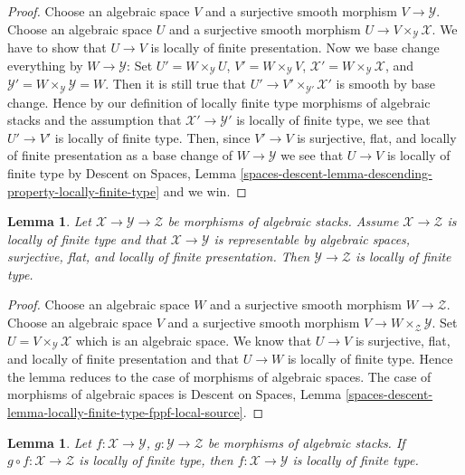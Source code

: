\documentclass{stacks-project}
\theoremstyle{plain}
\newtheorem{lemma}[subsection]{Lemma}
\theoremstyle{definition}
\theoremstyle{remark}
\numberwithin{equation}{subsection}
\begin{document}
\begin{proof}
Choose an algebraic space $V$ and a surjective smooth morphism
$V \to \mathcal{Y}$. Choose an algebraic space $U$ and a surjective
smooth morphism $U \to V \times_\mathcal{Y} \mathcal{X}$.
We have to show that $U \to V$ is locally of finite presentation.
Now we base change everything by $W \to \mathcal{Y}$: Set
$U' = W \times_\mathcal{Y} U$,
$V' = W \times_\mathcal{Y} V$,
$\mathcal{X}' = W \times_\mathcal{Y} \mathcal{X}$,
and $\mathcal{Y}' = W \times_\mathcal{Y} \mathcal{Y} = W$.
Then it is still true that $U' \to V' \times_{\mathcal{Y}'} \mathcal{X}'$
is smooth by base change. Hence by our definition of locally finite type
morphisms of algebraic stacks and the assumption that
$\mathcal{X}' \to \mathcal{Y}'$ is locally of finite type,
we see that $U' \to V'$ is locally of finite type. Then, since
$V' \to V$ is surjective, flat, and locally of finite presentation
as a base change of $W \to \mathcal{Y}$ we see that $U \to V$ is
locally of finite type by
Descent on Spaces, Lemma
\ref{spaces-descent-lemma-descending-property-locally-finite-type}
and we win.
\end{proof}

\begin{lemma}
\label{lemma-check-finite-type-precompose}
Let $\mathcal{X} \to \mathcal{Y} \to \mathcal{Z}$ be morphisms of
algebraic stacks. Assume $\mathcal{X} \to \mathcal{Z}$ is locally of finite
type and that $\mathcal{X} \to \mathcal{Y}$ is representable by algebraic
spaces, surjective, flat, and locally of finite presentation.
Then $\mathcal{Y} \to \mathcal{Z}$ is locally of finite type.
\end{lemma}

\begin{proof}
Choose an algebraic space $W$ and a surjective smooth morphism
$W \to \mathcal{Z}$. Choose an algebraic space $V$ and a surjective smooth
morphism $V \to W \times_\mathcal{Z} \mathcal{Y}$. Set
$U = V \times_\mathcal{Y} \mathcal{X}$ which is an algebraic space.
We know that $U \to V$ is surjective, flat, and locally of finite presentation
and that $U \to W$ is locally of finite type.
Hence the lemma reduces to the case of morphisms of algebraic spaces.
The case of morphisms of algebraic spaces is
Descent on Spaces, Lemma
\ref{spaces-descent-lemma-locally-finite-type-fppf-local-source}.
\end{proof}

\begin{lemma}
\label{lemma-finite-type-permanence}
Let $f : \mathcal{X} \to \mathcal{Y}$,
$g : \mathcal{Y} \to \mathcal{Z}$ be morphisms of algebraic stacks.
If $g \circ f : \mathcal{X} \to \mathcal{Z}$ is locally of finite type,
then $f : \mathcal{X} \to \mathcal{Y}$ is locally of finite type.
\end{lemma}
\end{document}
